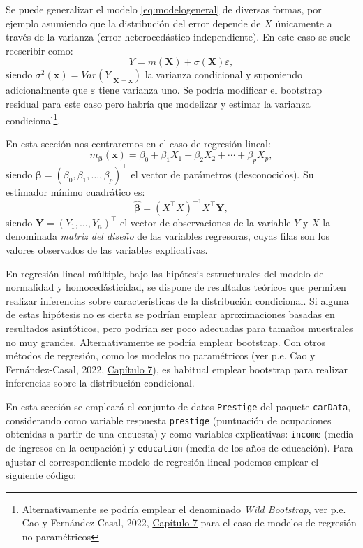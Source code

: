 \documentclass[
  10pt,
]{book}
\renewcommand{\boldsymbol}[1]{\symbf{#1}}
\renewcommand{\mathbf}[1]{\symbf{#1}}
\theoremstyle{break}
\theoremstyle{nonumberplain}
\let\oldfootnote\footnote
\renewcommand\footnote[1]{\oldfootnote{\hspace{2mm}#1}}
\begin{document}
Se puede generalizar el modelo \eqref{eq:modelogeneral} de diversas formas, por ejemplo asumiendo que la distribución del error depende de \(X\) únicamente a través de la varianza (error heterocedástico independiente).
En este caso se suele reescribir como:
\[Y = m(\mathbf{X}) + \sigma(\mathbf{X}) \varepsilon,\]
siendo \(\sigma^2(\mathbf{x}) = Var\left( \left. Y\right\vert_{\mathbf{X}=\mathbf{x}} \right)\) la varianza condicional y suponiendo adicionalmente que \(\varepsilon\) tiene varianza uno.
Se podría modificar el bootstrap residual para este caso pero habría que modelizar y estimar la varianza condicional\footnote{Alternativamente se podría emplear el denominado \emph{Wild Bootstrap}, ver p.e. Cao y Fernández-Casal, 2022, \href{https://rubenfcasal.github.io/book_remuestreo/m\%C3\%A9todos-de-remuestreo-en-regresi\%C3\%B3n-no-param\%C3\%A9trica.html\#wild-bootstrap}{Capítulo 7} para el caso de modelos de regresión no paramétricos}.

En esta sección nos centraremos en el caso de regresión lineal:
\[m_{\boldsymbol{\beta}}(\mathbf{x}) =  \beta_{0} + \beta_{1}X_{1} + \beta_{2}X_{2} + \cdots + \beta_{p}X_{p},\]
siendo \(\boldsymbol{\beta} = \left( \beta_{0}, \beta_{1}, \ldots, \beta_{p} \right)^{\top}\) el vector de parámetros (desconocidos).
Su estimador mínimo cuadrático es:
\[\boldsymbol{\hat{\beta}} = \left( X^{\top}X\right)^{-1}X^{\top}\mathbf{Y},\]
siendo \(\mathbf{Y} = \left( Y_{1}, \ldots, Y_{n} \right)^{\top}\) el vector de observaciones de la variable \(Y\) y \(X\) la denominada \emph{matriz del diseño} de las variables regresoras, cuyas filas son los valores observados de las variables explicativas.

En regresión lineal múltiple, bajo las hipótesis estructurales del modelo de normalidad y homocedásticidad, se dispone de resultados teóricos que permiten realizar inferencias sobre características de la distribución condicional. Si alguna de estas hipótesis no es cierta se podrían emplear aproximaciones basadas en resultados asintóticos, pero podrían ser poco adecuadas para tamaños muestrales no muy grandes. Alternativamente se podría emplear bootstrap.
Con otros métodos de regresión, como los modelos no paramétricos (ver p.e. Cao y Fernández-Casal, 2022, \href{https://rubenfcasal.github.io/book_remuestreo/m\%C3\%A9todos-de-remuestreo-en-regresi\%C3\%B3n-no-param\%C3\%A9trica.html}{Capítulo 7}), es habitual emplear bootstrap para realizar inferencias sobre la distribución condicional.

En esta sección se empleará el conjunto de datos \texttt{Prestige} del paquete \texttt{carData}, considerando como variable respuesta \texttt{prestige} (puntuación de ocupaciones obtenidas a partir de una encuesta) y como variables explicativas: \texttt{income} (media de ingresos en la ocupación) y \texttt{education} (media de los años de educación).
Para ajustar el correspondiente modelo de regresión lineal podemos emplear el siguiente código:
\end{document}
